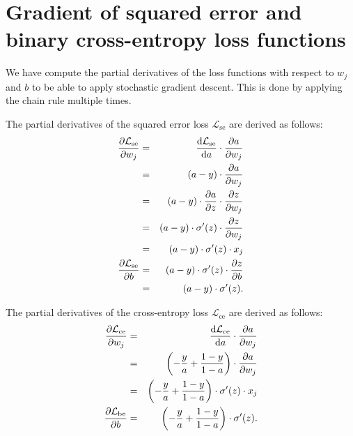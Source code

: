 \documentclass[12pt]{article}
\begin{document}
\section{Gradient of squared error and binary cross-entropy loss functions}

We have compute the partial derivatives of the loss functions with respect to $w_j$ and $b$ to be able to apply stochastic gradient descent. This is done by applying the chain rule multiple times. 

The partial derivatives of the squared error loss $\mathcal{L}_\mathrm{se}$ are derived as follows:
\begin{eqnarray}
{\partial \mathcal{L}_\mathrm{se} \over \partial w_j}
& = & 
{\mathrm{d} \mathcal{L}_\mathrm{se} \over \mathrm{d}a} \cdot {\partial a \over \partial w_j} \\
& = &
(a - y) \cdot {\partial a \over \partial w_j} \\
& = &
(a - y) \cdot {\partial a \over \partial z} \cdot {\partial z \over \partial w_j} \\
& = &
(a - y) \cdot \sigma'(z) \cdot {\partial z \over \partial w_j} \\
& = &
(a - y) \cdot \sigma'(z) \cdot x_j  \\
%
{\partial \mathcal{L}_\mathrm{se} \over \partial b} 
& = &
(a - y) \cdot \sigma'(z) \cdot {\partial z \over \partial b} \\
& = &
(a - y) \cdot \sigma'(z).
\end{eqnarray}

The partial derivatives of the cross-entropy loss $\mathcal{L}_\mathrm{ce}$ are derived as follows:
\begin{eqnarray}
{\partial \mathcal{L}_\mathrm{ce} \over \partial w_j}
& = & 
{\mathrm{d} \mathcal{L}_\mathrm{ce} \over \mathrm{d}a} \cdot {\partial a \over \partial w_j} \\
& = &
\left(-\frac{y}{a} + \frac{1-y}{1-a} \right) \cdot {\partial a \over \partial w_j} \\
& = &
\left(-\frac{y}{a} + \frac{1-y}{1-a} \right) \cdot \sigma'(z) \cdot x_j  \\
%
{\partial \mathcal{L}_\mathrm{be} \over \partial b} 
& = & 
\left(-\frac{y}{a} + \frac{1-y}{1-a} \right) \cdot \sigma'(z).
\end{eqnarray}
\end{document}
